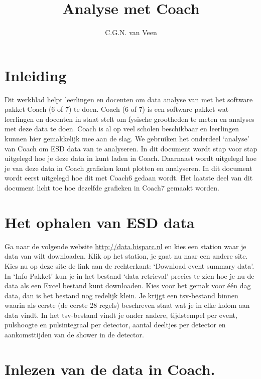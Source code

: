 

\title{Analyse met Coach}
\author{C.G.N. van Veen}



\maketitle

\section{Inleiding}

Dit werkblad helpt leerlingen en docenten om data analyse van \hisparc met
het software pakket Coach (6 of 7) te doen. Coach (6 of 7) is een software pakket wat leerlingen
en docenten in staat stelt om fysische grootheden te meten en analyses met deze
data te doen. Coach is al op veel scholen beschikbaar en leerlingen kunnen hier
gemakkelijk mee aan de slag.
We gebruiken het onderdeel `analyse' van Coach om ESD data van \hisparc te analyseren.
In dit document wordt stap voor stap uitgelegd hoe je deze data in kunt laden in
Coach. Daarnaast wordt uitgelegd hoe je van deze data in Coach
grafieken kunt plotten en analyseren. In dit document wordt eerst uitgelegd hoe
dit met Coach6 gedaan wordt. Het laatste deel van dit document licht toe hoe dezelfde grafieken
in Coach7 gemaakt worden.

\section{Het ophalen van ESD data}

Ga naar de volgende website \url{http://data.hisparc.nl} en kies een station waar
je data van wilt downloaden. Klik op het station, je gaat nu naar een andere site.
Kies nu op deze site de link aan de rechterkant: `Download event summary data'.
In `Info Pakket' kun je in het bestand `data retrieval' precies te zien hoe je
nu de data als een Excel bestand kunt downloaden.
Kies voor het gemak voor één dag data, dan is het bestand nog redelijk klein.
Je krijgt een tsv-bestand binnen waarin als eerste (de eerste 28 regels) beschreven staat wat je
in elke kolom aan data vindt. In het tsv-bestand vindt je onder andere, tijdstempel per event,
pulshoogte en pulsintegraal per detector, aantal deeltjes per detector en aankomsttijden van
de shower in de detector.

\section{Inlezen van de data in Coach.}

